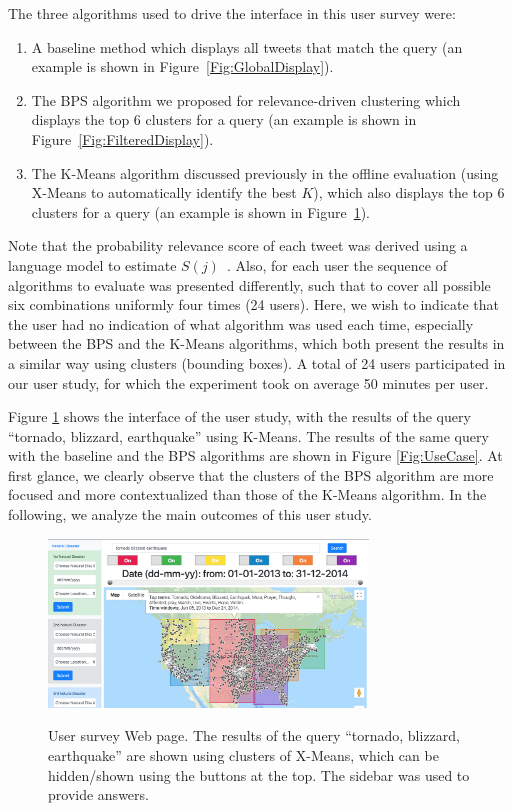 The three algorithms used to drive the interface in this user survey were:
\begin{enumerate}
\item A baseline method which displays all tweets that match the query (an example is shown in  Figure~\ref{Fig:GlobalDisplay}).
\item The BPS algorithm we proposed for relevance-driven clustering which displays the top 6 clusters for a query (an example is shown in Figure~\ref{Fig:FilteredDisplay}).
\item The K-Means algorithm discussed previously in the offline evaluation (using X-Means to automatically identify the best $K$), which also displays the top 6 clusters for a query (an example is shown in Figure~\ref{fig:ScreenShot}).
\end{enumerate}

Note that the probability relevance score of each tweet was derived using a language model to estimate $S(j)$~\cite{Zhai2001}.
Also, for each user the sequence of algorithms to evaluate was presented differently, such that to cover all possible six combinations uniformly four times (24 users).  Here, we wish to indicate that the user had no indication of what algorithm was used each time, especially between the BPS and the K-Means algorithms, which both present the results in a similar way using clusters (bounding boxes). 
A total of 24 users participated in our user study, for which the experiment took on average 50 minutes per user.

Figure \ref{fig:ScreenShot} shows the interface of the user study, with the results of the query ``tornado, blizzard, earthquake''  using K-Means. The results of the same query with the baseline and the BPS algorithms are shown in Figure \ref{Fig:UseCase}. At first glance, we clearly observe that the clusters of the BPS algorithm are more focused and more contextualized than those of the K-Means algorithm.  In the following, we analyze the main outcomes of this user study.



\begin{figure}[t]
\begin{centering}
{\includegraphics[width=8.5cm]{imgs/kmeans}}
\par\end{centering}
\caption{User survey Web page. The results of the query ``tornado, blizzard, earthquake''  are shown using clusters of X-Means, which can be hidden/shown using the buttons at the top. The sidebar was used to provide answers.}
\label{fig:ScreenShot}
\end{figure}


